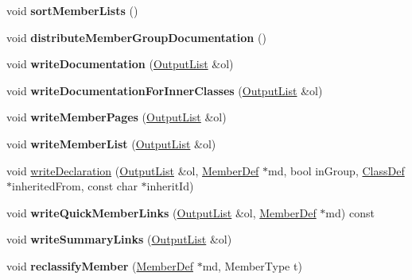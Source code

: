\begin{DoxyCompactItemize}
void {\bfseries sort\+Member\+Lists} ()
\item 
\mbox{\label{class_class_def_aaa19050a06de4d2159d19c7b586e6cd2}} 
void {\bfseries distribute\+Member\+Group\+Documentation} ()
\item 
\mbox{\label{class_class_def_abdd9efb495d4f901b22d1fed1b26d210}} 
void {\bfseries write\+Documentation} (\mbox{\hyperlink{class_output_list}{Output\+List}} \&ol)
\item 
\mbox{\label{class_class_def_a2d02ed5a834d3e56c67d57b7fe8ea669}} 
void {\bfseries write\+Documentation\+For\+Inner\+Classes} (\mbox{\hyperlink{class_output_list}{Output\+List}} \&ol)
\item 
\mbox{\label{class_class_def_ac8f891bbbe8c8319ba381e75f86e2633}} 
void {\bfseries write\+Member\+Pages} (\mbox{\hyperlink{class_output_list}{Output\+List}} \&ol)
\item 
\mbox{\label{class_class_def_a819888b69265792ce9d47e4a6a045695}} 
void {\bfseries write\+Member\+List} (\mbox{\hyperlink{class_output_list}{Output\+List}} \&ol)
\item 
void \mbox{\hyperlink{class_class_def_ab9701f34d56e4dfee3e4ccd2fd6a6f5b}{write\+Declaration}} (\mbox{\hyperlink{class_output_list}{Output\+List}} \&ol, \mbox{\hyperlink{class_member_def}{Member\+Def}} $\ast$md, bool in\+Group, \mbox{\hyperlink{class_class_def}{Class\+Def}} $\ast$inherited\+From, const char $\ast$inherit\+Id)
\item 
\mbox{\label{class_class_def_a6f3f4ba3220b1c1b5dff3435539167cb}} 
void {\bfseries write\+Quick\+Member\+Links} (\mbox{\hyperlink{class_output_list}{Output\+List}} \&ol, \mbox{\hyperlink{class_member_def}{Member\+Def}} $\ast$md) const
\item 
\mbox{\label{class_class_def_a762b3d42ab68e224a073fce8dce2c905}} 
void {\bfseries write\+Summary\+Links} (\mbox{\hyperlink{class_output_list}{Output\+List}} \&ol)
\item 
\mbox{\label{class_class_def_a5bec49ae8b7277ebfa0fab4c383bc35f}} 
void {\bfseries reclassify\+Member} (\mbox{\hyperlink{class_member_def}{Member\+Def}} $\ast$md, Member\+Type t)

\end{DoxyCompactItemize}
